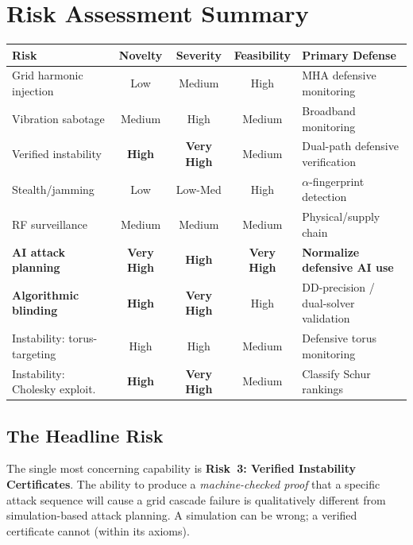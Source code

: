 \documentclass[11pt,a4paper]{article}
\begin{document}
\section{Risk Assessment Summary}

\begin{center}
\small
\begin{tabular}{@{}lcccl@{}}
\toprule
\textbf{Risk} & \textbf{Novelty} & \textbf{Severity} &
\textbf{Feasibility} & \textbf{Primary Defense} \\
\midrule
Grid harmonic injection & Low & Medium & High & MHA defensive monitoring \\
Vibration sabotage & Medium & High & Medium & Broadband monitoring \\
Verified instability & \textbf{High} & \textbf{Very High} &
  Medium & Dual-path defensive verification \\
Stealth/jamming & Low & Low-Med & High & $\alpha$-fingerprint detection \\
RF surveillance & Medium & Medium & Medium & Physical/supply chain \\
\textbf{AI attack planning} & \textbf{Very High} & \textbf{High} &
  \textbf{Very High} & \textbf{Normalize defensive AI use} \\
\textbf{Algorithmic blinding} & \textbf{High} & \textbf{Very High} &
  High & DD-precision / dual-solver validation \\
\midrule
Instability: torus-targeting & High & High & Medium & Defensive torus monitoring \\
Instability: Cholesky exploit. & \textbf{High} & \textbf{Very High} & Medium & Classify Schur rankings \\
\bottomrule
\end{tabular}
\end{center}

\subsection{The Headline Risk}

The single most concerning capability is \textbf{Risk~3: Verified
Instability Certificates}. The ability to produce a
\emph{machine-checked proof} that a specific attack sequence will
cause a grid cascade failure is qualitatively different from
simulation-based attack planning. A simulation can be wrong; a
verified certificate cannot (within its axioms).
\end{document}
